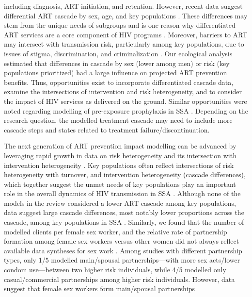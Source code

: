 including diagnosis, ART initiation, and retention.
However, recent data suggest differential ART cascade by sex, age, and key populations
\cite{Lancaster2016,Stannah2019,Ma2020,Green2020}.
These differences may stem from the unique needs of subgroups
and is one reason why differentiated ART services are a core component of HIV programs
\cite{Chikwari2018,Ehrenkranz2019}.
Moreover, barriers to ART may intersect with transmission risk, particularly among key populations,
due to issues of stigma, discrimination, and criminalization \cite{Ortblad2019,Baral2019}.
Our ecological analysis estimated that
differences in cascade by sex (lower among men) or risk (key populations prioritized)
had a large influence on projected ART prevention benefits.
Thus, opportunities exist to incorporate differentiated cascade data,
examine the intersections of intervention and risk heterogeneity, and
to consider the impact of HIV services as delivered on the ground.
Similar opportunities were noted regarding modelling of pre-exposure prophylaxis in SSA \cite{Case2019}.
Depending on the research question, the modelled treatment cascade may need
to include more cascade steps and states related to treatment failure/discontinuation.
\par
The next generation of ART prevention impact modelling can be advanced by leveraging
rapid growth in data on risk heterogeneity and its intersection with intervention heterogeneity
\cite{Beyrer2012,Baral2012,Mishra2016}.
Key populations often reflect intersections of risk heterogeneity with turnover,
and intervention heterogeneity (cascade differences),
which together suggest the unmet needs of key populations
play an important role in the overall dynamics of HIV transmission in SSA \cite{Bekker2015,Stone2021}.
Although none of the models in the review considered a lower ART cascade among key populations,
data suggest large cascade differences, most notably lower proportions across the cascade,
among key populations in SSA \cite{Mountain2014sr,Hakim2018,Stannah2019}.
Similarly, we found that the number of modelled clients per female sex worker, and
the relative rate of partnership formation among female sex workers versus other women
did not always reflect available data syntheses for sex work \cite{Watts2010,Scorgie2012}.
Among studies with different partnership types, only 1/5 modelled
main/spousal partnerships---with more sex acts/lower condom use---between two higher risk individuals,
while 4/5 modelled only casual/commercial partnerships among higher risk individuals.
However, data suggest that female sex workers form main/spousal partnerships
